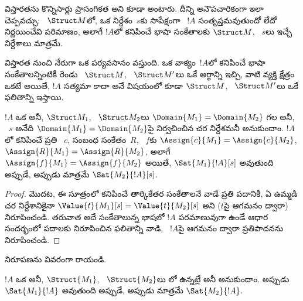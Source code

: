 \documentclass[../../../include/open-logic-section]{subfiles}
\begin{document}


\begin{explain}
విస్తారతను కొన్నిసార్లు ప్రాసంగికత అని కూడా అంటారు. దీన్ని అనౌపచారికంగా ఇలా
చెప్పవచ్చు: ~$\Struct M$లో, ఒక  నిర్దేశం~$s$కు
సాపేక్షంగా ~$!A$ సంతృప్తమవుతుందో లేదో నిర్ణయించేవి
 పరిమాణం, అలాగే $!A$లో కనిపించే భాషా సంకేతాలకు
$\Struct M$, ~$s$లు ఇచ్చే నిర్దేశాలు మాత్రమే.

విస్తారత నుంచి నేరుగా ఒక పర్యవసానం వస్తుంది. ఒక వాక్యం~$!A$లో కనిపించే భాషా
సంకేతాలన్నింటికీ రెండు ~$\Struct M$, ~$\Struct M'$లు
ఒకే అర్థాన్ని ఇచ్చి, వాటి వ్యక్తి క్షేత్రం ఒకటే అయితే, $!A$ సత్యమా కాదా అనే
విషయంలో కూడా $\Struct M$, ~$\Struct M'$లు ఒకే ఫలితాన్ని ఇస్తాయి.
\end{explain}

\begin{prop}[విస్తారత]
  $!A$ ఒక  అనీ, $\Struct M_1$, ~$\Struct M_2$లు
  $\Domain{M_1} = \Domain{M_2}$ గల  అనీ, ~$s$ అనేది
  $\Domain{M_1} = \Domain{M_2}$పై నిర్వచించిన చర నిర్దేశమనీ అనుకుందాం. $!A$లో
  కనిపించే ప్రతి ~$c$, సంబంధ సంకేతం~$R$, ~$f$కు
  $\Assign{c}{M_1} = \Assign{c}{M_2}$,
  $\Assign{R}{M_1}=\Assign{R}{M_2}$, అలాగే
  $\Assign{f}{M_1} = \Assign{f}{M_2}$ అయితే,
  $\Sat{M_1}{!A}[s]$ అవుతుంది అప్పుడే, అప్పుడు మాత్రమే
  $\Sat{M_2}{!A}[s]$.
\end{prop}

\begin{proof}
  మొదట, ఈ సూత్రంలో కనిపించే తార్కికేతర సంకేతాలనే వాడే ప్రతి పదానికీ, ఏ ఉమ్మడి చర నిర్దేశానికైనా
  $\Value{t}{M_1}[s] = \Value{t}{M_2}[s]$ అని ($t$పై ఆగమనం ద్వారా) నిరూపించండి. తరువాత అదే సంకేతాలున్న భాషలో
  $!A$ పరమాణువుగా ఉండే ఆధార సందర్భంలో పదాలకు నిరూపించిన ఫలితాన్ని వాడి, ~$!A$పై ఆగమనం ద్వారా
  ప్రతిపాదనను నిరూపించండి.
\end{proof}

\begin{prob}
 నిరూపణను వివరంగా
రాయండి.
\end{prob}

\begin{cor}
  $!A$ ఒక  అనీ, $\Struct{M_1}$, ~$\Struct{M_2}$లు
  లో ఉన్నట్లే అనీ అనుకుందాం. అప్పుడు
  $\Sat{M_1}{!A}$ అవుతుంది అప్పుడే, అప్పుడు మాత్రమే $\Sat{M_2}{!A}$.
\end{cor}
\end{document}
